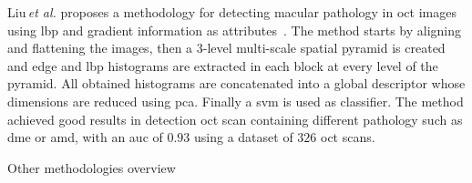 Liu\,\textit{et al.} proposes a methodology for detecting macular pathology in \ac{oct} images using \ac{lbp} and gradient information as attributes~\cite{Liu2011}.
The method starts by aligning and flattening the images, then a $3$-level multi-scale spatial pyramid is created and edge and \ac{lbp} histograms are extracted in each block at every level of the pyramid. 
All obtained histograms are concatenated into a global descriptor whose dimensions are reduced using \ac{pca}. Finally a \ac{svm} is used as classifier. 
The method achieved good results in detection \ac{oct} scan containing different pathology such as \ac{dme} or \ac{amd}, with an \ac{auc} of $0.93$ using a dataset of $326$ \ac{oct} scans.  


\begin{table}
  \caption{Other methodologies overview}
  \centering
  
  \label{tab:survey}
\end{table}



